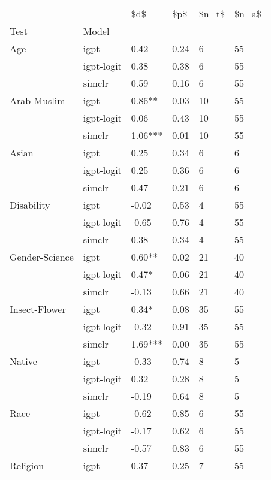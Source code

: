 \begin{tabular}{llllll}
\toprule
       &        &      \$d\$ &  \$p\$ & \$n\_t\$ & \$n\_a\$ \\
Test & Model &          &      &       &       \\
\midrule
Age & igpt &     0.42 & 0.24 &     6 &    55 \\
       & igpt-logit &     0.38 & 0.38 &     6 &    55 \\
       & simclr &     0.59 & 0.16 &     6 &    55 \\
Arab-Muslim & igpt &   0.86** & 0.03 &    10 &    55 \\
       & igpt-logit &     0.06 & 0.43 &    10 &    55 \\
       & simclr &  1.06*** & 0.01 &    10 &    55 \\
Asian & igpt &     0.25 & 0.34 &     6 &     6 \\
       & igpt-logit &     0.25 & 0.36 &     6 &     6 \\
       & simclr &     0.47 & 0.21 &     6 &     6 \\
Disability & igpt &    -0.02 & 0.53 &     4 &    55 \\
       & igpt-logit &    -0.65 & 0.76 &     4 &    55 \\
       & simclr &     0.38 & 0.34 &     4 &    55 \\
Gender-Science & igpt &   0.60** & 0.02 &    21 &    40 \\
       & igpt-logit &    0.47* & 0.06 &    21 &    40 \\
       & simclr &    -0.13 & 0.66 &    21 &    40 \\
Insect-Flower & igpt &    0.34* & 0.08 &    35 &    55 \\
       & igpt-logit &    -0.32 & 0.91 &    35 &    55 \\
       & simclr &  1.69*** & 0.00 &    35 &    55 \\
Native & igpt &    -0.33 & 0.74 &     8 &     5 \\
       & igpt-logit &     0.32 & 0.28 &     8 &     5 \\
       & simclr &    -0.19 & 0.64 &     8 &     5 \\
Race & igpt &    -0.62 & 0.85 &     6 &    55 \\
       & igpt-logit &    -0.17 & 0.62 &     6 &    55 \\
       & simclr &    -0.57 & 0.83 &     6 &    55 \\
Religion & igpt &     0.37 & 0.25 &     7 &    55 \\

\end{tabular}
